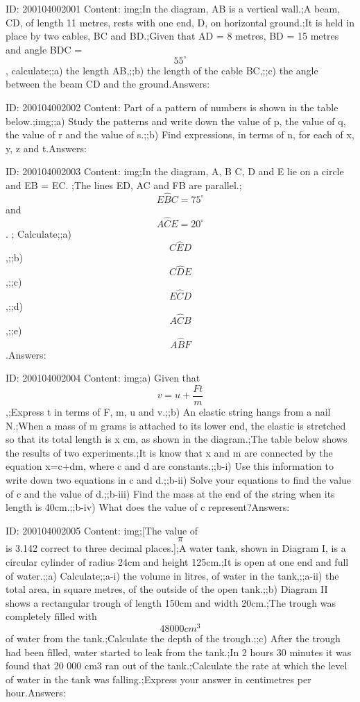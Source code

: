 \documentclass{article}
\begin{document}
ID: 200104002001
Content:
img;In the diagram, AB is a vertical wall.;A beam, CD, of length 11 metres, rests with one end, D, on horizontal ground.;It is held in place by two cables, BC and BD.;Given that AD = 8 metres, BD = 15 metres and angle BDC = $$55^{\circ}$$, calculate;;a) the length AB,;;b) the length of the cable BC,;;c) the angle between the beam CD and the ground.Answers:

ID: 200104002002
Content:
Part of a pattern of numbers is shown in the table below.;img;;a) Study the patterns and write down the value of p, the value of q, the value of r and the value of s.;;b) Find expressions, in terms of n, for each of x, y, z and t.Answers:

ID: 200104002003
Content:
img;In the diagram, A, B C, D and E lie on a circle and EB = EC. ;The lines ED, AC and FB are parallel.;$$E \hat BC = 75^{\circ}$$ and $$A \hat CE = 20^{\circ}$$. ; Calculate;;a) $$C \hat ED$$,;;b) $$C \hat DE$$,;;c) $$E \hat CD$$,;;d) $$A \hat CB$$,;;e) $$A \hat BF$$.Answers:

ID: 200104002004
Content:
img;a) Given that $$v = u + \frac{Ft}{m}$$,;Express t in terms of F, m, u and v.;;b) An elastic string hangs from a nail N.;When a mass of m grams is attached to its lower end, the elastic is stretched so that its total length is x cm, as shown in the diagram.;The table below shows the results of two experiments.;It is know that x and m are connected by the equation x=c+dm, where c and d are constants.;;b-i) Use this information to write down two equations in c and d.;;b-ii) Solve your equations to find the value of c and the value of d.;;b-iii) Find the mass at the end of the string when its length is 40cm.;;b-iv) What does the value of c represent?Answers:

ID: 200104002005
Content:
img;[The value of $$\pi$$ is 3.142 correct to three decimal places.];A water tank, shown in Diagram I, is a circular cylinder of radius 24cm and height 125cm.;It is open at one end and full of water.;;a) Calculate;;a-i) the volume in litres, of water in the tank,;;a-ii) the total area, in square metres, of the outside of the open tank.;;b) Diagram II shows a rectangular trough of length 150cm and width 20cm.;The trough was completely filled with $$48 000cm^3$$ of water from the tank.;Calculate the depth of the trough.;;c) After the trough had been filled, water started to leak from the tank.;In 2 hours 30 minutes it was found that 20 000 cm3 ran out of the tank.;Calculate the rate at which the level of water in the tank was falling.;Express your answer in centimetres per hour.Answers:
\end{document}
